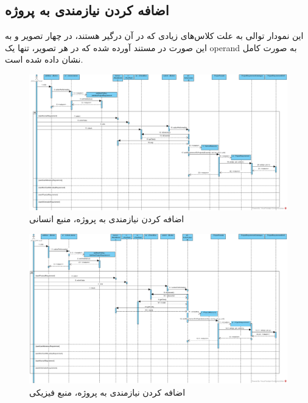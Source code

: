 \begin{landscape}
\section{اضافه کردن نیازمندی به پروژه}
این نمودار توالی به علت کلاس‌های زیادی که در آن درگیر هستند، در چهار تصویر و به این صورت در مستند آورده شده که در هر تصویر، تنها یک operand به صورت کامل نشان داده شده است.
\begin{figure}[H]
	\centering
	\includegraphics[scale=0.5]{img/sequence-design/AddRequirementToProject_HUMAN}
	\caption{اضافه کردن نیازمندی به پروژه، منبع انسانی}
\end{figure}
\begin{figure}[H]
	\centering
	\includegraphics[scale=0.5]{img/sequence-design/AddRequirementToProject_PHYSICAL}
	\caption{اضافه کردن نیازمندی به پروژه، منبع فیزیکی}
\end{figure}
\begin{figure}[H]
	\centering

\end{figure}
\end{landscape}
